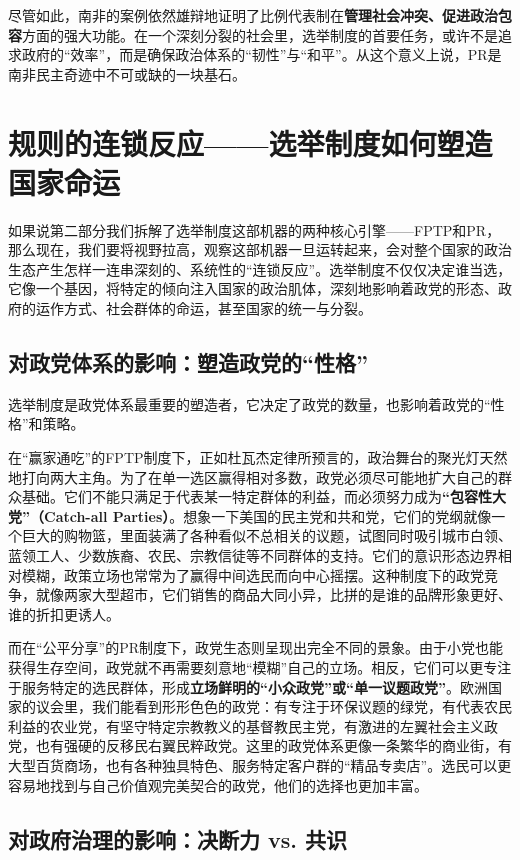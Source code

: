 尽管如此，南非的案例依然雄辩地证明了比例代表制在\textbf{管理社会冲突、促进政治包容}方面的强大功能。在一个深刻分裂的社会里，选举制度的首要任务，或许不是追求政府的“效率”，而是确保政治体系的“韧性”与“和平”。从这个意义上说，PR是南非民主奇迹中不可或缺的一块基石。

\section{规则的连锁反应——选举制度如何塑造国家命运}

如果说第二部分我们拆解了选举制度这部机器的两种核心引擎——FPTP和PR，那么现在，我们要将视野拉高，观察这部机器一旦运转起来，会对整个国家的政治生态产生怎样一连串深刻的、系统性的“连锁反应”。选举制度不仅仅决定谁当选，它像一个基因，将特定的倾向注入国家的政治肌体，深刻地影响着政党的形态、政府的运作方式、社会群体的命运，甚至国家的统一与分裂。

\subsection{对政党体系的影响：塑造政党的“性格”}

选举制度是政党体系最重要的塑造者，它决定了政党的数量，也影响着政党的“性格”和策略。

在“赢家通吃”的FPTP制度下，正如杜瓦杰定律所预言的，政治舞台的聚光灯天然地打向两大主角。为了在单一选区赢得相对多数，政党必须尽可能地扩大自己的群众基础。它们不能只满足于代表某一特定群体的利益，而必须努力成为\textbf{“包容性大党”（Catch-all Parties）}。想象一下美国的民主党和共和党，它们的党纲就像一个巨大的购物篮，里面装满了各种看似不总相关的议题，试图同时吸引城市白领、蓝领工人、少数族裔、农民、宗教信徒等不同群体的支持。它们的意识形态边界相对模糊，政策立场也常常为了赢得中间选民而向中心摇摆。这种制度下的政党竞争，就像两家大型超市，它们销售的商品大同小异，比拼的是谁的品牌形象更好、谁的折扣更诱人。

而在“公平分享”的PR制度下，政党生态则呈现出完全不同的景象。由于小党也能获得生存空间，政党就不再需要刻意地“模糊”自己的立场。相反，它们可以更专注于服务特定的选民群体，形成\textbf{立场鲜明的“小众政党”或“单一议题政党”}。欧洲国家的议会里，我们能看到形形色色的政党：有专注于环保议题的绿党，有代表农民利益的农业党，有坚守特定宗教教义的基督教民主党，有激进的左翼社会主义政党，也有强硬的反移民右翼民粹政党。这里的政党体系更像一条繁华的商业街，有大型百货商场，也有各种独具特色、服务特定客户群的“精品专卖店”。选民可以更容易地找到与自己价值观完美契合的政党，他们的选择也更加丰富。

\subsection{对政府治理的影响：决断力 vs. 共识}

